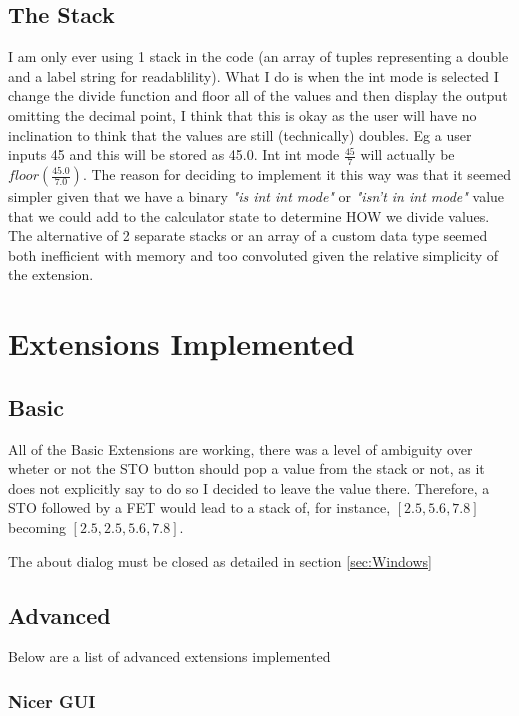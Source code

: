 \documentclass[12pt]{article} %
\begin{document}
\subsection{The Stack}
\label{sec:Stack}

I am only ever using 1 stack in the code (an array of tuples representing a double and a label string for readablility). What I do is when the int mode is selected I change the divide function and floor all of the values and then display the output omitting the decimal point, I think that this is okay as the user will have no inclination to think that the values are still (technically) doubles. Eg a user inputs 45 and this will be stored as 45.0. Int int mode $\frac{45}{7}$ will actually be $floor \left( \frac{45.0}{7.0} \right) $. The reason for deciding to implement it this way was that it seemed simpler given that we have a binary \textit{"is int int mode"} or \textit{"isn't in int mode"} value that we could add to the calculator state to determine HOW we divide values. The alternative of 2 separate stacks or an array of a custom data type seemed both inefficient with memory and too convoluted given the relative simplicity of the extension.


\newpage
\section{Extensions Implemented}
\subsection{Basic}

All of the Basic Extensions are working, there was a level of ambiguity over wheter or not the STO button should pop a value from the stack or not, as it does not explicitly say to do so I decided to leave the value there. Therefore, a STO followed by a FET would lead to a stack of, for instance, $[2.5, 5.6, 7.8]$ becoming $[2.5, 2.5, 5.6, 7.8]$.

The about dialog must be closed as detailed in section \ref{sec:Windows}

\subsection{Advanced}

Below are a list of advanced extensions implemented
\subsubsection{Nicer GUI}
\end{document}
